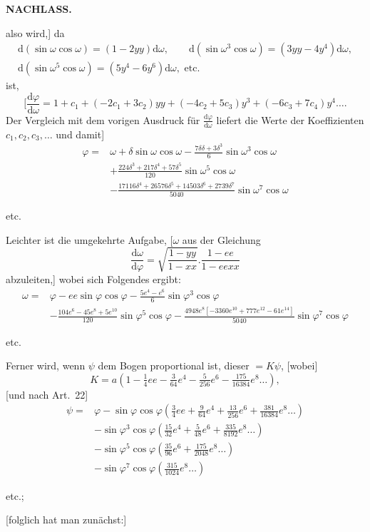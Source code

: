 \par\clearpage
{}\hfill{\small\textbf{NACHLASS.}}\hfill\null\par\medskip
\noindent also wird,] da
\[
\begin{gathered}
\mathrm d(\sin\omega\cos\omega)=(1-2yy)\mathrm d\omega,\qquad
\mathrm d(\sin\omega^3\cos\omega)=(3yy-4y^4)\mathrm d\omega,\\
\mathrm d(\sin\omega^5\cos\omega)=(5y^4-6y^6)\mathrm d\omega,\text{ etc.}
\end{gathered}
\]
\noindent ist,
\[
[\frac{\mathrm d\varphi}{\mathrm d\omega}=1+c_1+(-2c_1+3c_2)yy+(-4c_2+5c_3)y^3+(-6c_3+7c_4)y^4\ldots.
\]
Der Vergleich mit dem vorigen Ausdruck für \(\frac{\mathrm d\varphi}{\mathrm d\omega}\) liefert die Werte der Koeffizienten \(c_1,c_2,c_3,\ldots\) und damit]
\[
\begin{aligned}
\varphi={}&\omega+\delta\sin\omega\cos\omega-\frac{7\delta\delta+3\delta^3}{6}\sin\omega^3\cos\omega\\
&+\frac{224\delta^3+217\delta^4+57\delta^5}{120}\sin\omega^5\cos\omega\\
&-\frac{17116\delta^4+26576\delta^5+14503\delta^6+2739\delta^7}{5040}\sin\omega^7\cos\omega
\end{aligned}
\]
{\centering etc.\par}
\bigskip
{\centering [24.]\par}
Leichter ist die umgekehrte Aufgabe, [\(\omega\) aus der Gleichung
\[
\frac{\mathrm d\omega}{\mathrm d\varphi}=\sqrt{\frac{1-yy}{1-xx}}.\frac{1-ee}{1-eexx}
\]
\noindent abzuleiten,] wobei sich Folgendes ergibt:
\[
\begin{aligned}
\omega={}&\varphi-ee\sin\varphi\cos\varphi-\frac{5e^4-e^6}{6}\sin\varphi^3\cos\varphi\\
&-\frac{104e^6-45e^8+5e^{10}}{120}\sin\varphi^5\cos\varphi
-\frac{4948e^8[-3360e^{10}+777e^{12}-61e^{14}]}{5040}\sin\varphi^7\cos\varphi
\end{aligned}
\]
{\centering etc.\par}
Ferner wird, wenn \(\psi\) dem Bogen proportional ist, dieser \(=K\psi\), [wobei]
\[K=a(1-\tfrac14ee-\tfrac3{64}e^4-\tfrac5{256}e^6-\tfrac{175}{16384}e^8\ldots),\]
[und nach Art.~22]
\[
\begin{aligned}
\psi={}&\varphi-\sin\varphi\cos\varphi(\tfrac34ee+\tfrac9{64}e^4+\tfrac{13}{256}e^6+\tfrac{381}{16384}e^8\ldots)\\
&-\sin\varphi^3\cos\varphi(\tfrac{15}{32}e^4+\tfrac5{48}e^6+\tfrac{335}{8192}e^8\ldots)\\
&-\sin\varphi^5\cos\varphi(\tfrac{35}{96}e^6+\tfrac{175}{2048}e^8\ldots)\\
&-\sin\varphi^7\cos\varphi(\tfrac{315}{1024}e^8\ldots)
\end{aligned}
\]
{\centering etc.;\par}
[folglich hat man zunächst:]


